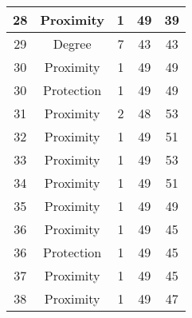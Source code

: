 \documentclass[results.tex]{subfiles}
\begin{document}
\begin{center}
\begin{tabular}{| c || c | c | c | c |}
            \hline
            28                      & Proximity                    & 1                      & 49                      & 39                   \\
            \hline
            29                      & Degree                       & 7                      & 43                      & 43                   \\
            \hline
            30                      & Proximity                    & 1                      & 49                      & 49                   \\
            \hline
            30                      & Protection                   & 1                      & 49                      & 49                   \\
            \hline
            31                      & Proximity                    & 2                      & 48                      & 53                   \\
            \hline
            32                      & Proximity                    & 1                      & 49                      & 51                   \\
            \hline
            33                      & Proximity                    & 1                      & 49                      & 53                   \\
            \hline
            34                      & Proximity                    & 1                      & 49                      & 51                   \\
            \hline
            35                      & Proximity                    & 1                      & 49                      & 49                   \\
            \hline
            36                      & Proximity                    & 1                      & 49                      & 45                   \\
            \hline
            36                      & Protection                   & 1                      & 49                      & 45                   \\
            \hline
            37                      & Proximity                    & 1                      & 49                      & 45                   \\
            \hline
            38                      & Proximity                    & 1                      & 49                      & 47                   \\

\end{tabular}
\end{center}
\end{document}
